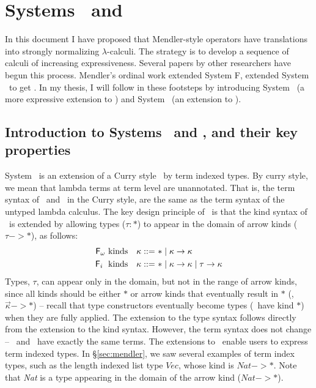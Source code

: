 \section{Systems \Fi\ and \Fixi}\label{sec:Fi}

In this document I have proposed that Mendler-style operators have translations
into strongly normalizing $\lambda$-calculi. The strategy is to develop
a sequence of calculi of increasing expressiveness. Several papers by other
researchers have begun this process. Mendler's ordinal work \cite{Mendler87}
extended System \textsf{F}, \citet{AbeMat04} extended System \Fw\ to get \Fixw.
In my thesis, I will follow in these footsteps by introducing System \Fi\
(a more expressive extension to \Fw) and System \Fixi\ (an extension to \Fixw).


\subsection{Introduction to Systems \Fi\ and \Fixi, and their key properties}
System \Fi\ is an extension of a Curry style \Fw\ by term indexed types.
By curry style, we mean that lambda terms at term level are unannotated.
That is, the term syntax of \Fi\ and \Fw\, in the Curry style, are
the same as the term syntax of the untyped lambda calculus.
The key design principle of \Fi\ is that the kind syntax of \Fw\ is extended
by allowing types ($\tau : *$) to appear in the domain of arrow kinds
($\tau -> *$), as follows:
\begin{align*}
\text{\ensuremath{\mathsf{F}_\omega}\ kinds} ~~~ \kappa ::= ~ & * \mid \kappa -> \kappa \\
\text{\ensuremath{\mathsf{F}_i}\; kinds}~~~ \kappa ::= ~ & * \mid \kappa -> \kappa \mid \tau -> \kappa
\end{align*}
Types, $\tau$, can appear only in the domain, but not in the range of
arrow kinds, since all kinds should be either $*$ or arrow kinds
that eventually result in $*$ (\ie, $\vec{\kappa} -> *$) -- recall that
type constructors eventually become types (\ie\ have kind $*$) when they are fully applied.
The extension to the type syntax follows directly from the extension to the kind syntax.
However, the term syntax does not change -- \Fi\ and \Fw\ have exactly the
same terms.
The extensions to \Fi\ enable users to express term indexed types.
In \S\ref{sec:mendler}, we saw several examples of term index types, such as
the length indexed list type $\textit{Vec}$, whose kind is $\textit{Nat} -> *$.
Note that \textit{Nat} is a type appearing in the domain of the arrow kind
($\textit{Nat} -> *$).

